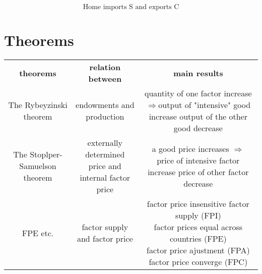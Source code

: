 \documentclass{article}
\begin{document}
$$\text{Home imports S and exports C}$$

\section{Theorems}

\begin{center}
\begin{tabular}{ c c c }
 \textbf{theorems} & \textbf{relation between} & \textbf{main results}\\
 The Rybeyzinski theorem & endowments and production & \thead{quantity of one factor increase\\$\Rightarrow$output of "intensive" good increase\\output of the other good decrease} \\ 
 The Stoplper-Samuelson theorem & \thead{externally determined price and \\internal factor price} & \thead{a good price increases \\$\Rightarrow$ price of intensive factor increase\\price of other factor decrease} \\  
 FPE etc. & factor supply and factor price & \thead{factor price insensitive factor supply (FPI)\\factor prices equal across countries (FPE)\\factor price ajustment (FPA)\\factor price converge (FPC)}
\end{tabular}
\end{center}
\end{document}
